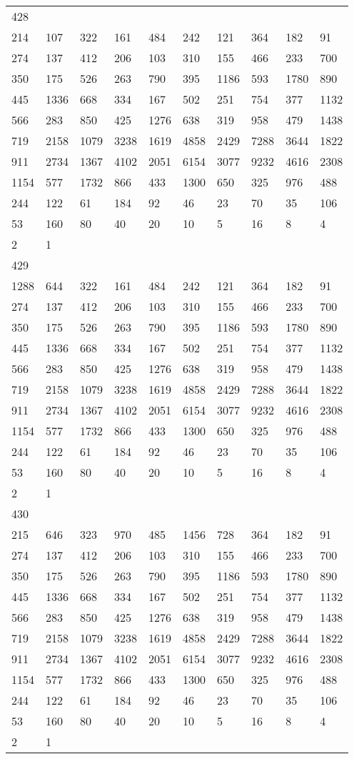 \begin{longtable}{*{10}{l}}
428&&&&&&&&&\\
214& 107& 322& 161& 484& 242& 121& 364& 182& 91\\
274& 137& 412& 206& 103& 310& 155& 466& 233& 700\\
350& 175& 526& 263& 790& 395& 1186& 593& 1780& 890\\
445& 1336& 668& 334& 167& 502& 251& 754& 377& 1132\\
566& 283& 850& 425& 1276& 638& 319& 958& 479& 1438\\
719& 2158& 1079& 3238& 1619& 4858& 2429& 7288& 3644& 1822\\
911& 2734& 1367& 4102& 2051& 6154& 3077& 9232& 4616& 2308\\
1154& 577& 1732& 866& 433& 1300& 650& 325& 976& 488\\
244& 122& 61& 184& 92& 46& 23& 70& 35& 106\\
53& 160& 80& 40& 20& 10& 5& 16& 8& 4\\
2& 1& \\

429&&&&&&&&&\\
1288& 644& 322& 161& 484& 242& 121& 364& 182& 91\\
274& 137& 412& 206& 103& 310& 155& 466& 233& 700\\
350& 175& 526& 263& 790& 395& 1186& 593& 1780& 890\\
445& 1336& 668& 334& 167& 502& 251& 754& 377& 1132\\
566& 283& 850& 425& 1276& 638& 319& 958& 479& 1438\\
719& 2158& 1079& 3238& 1619& 4858& 2429& 7288& 3644& 1822\\
911& 2734& 1367& 4102& 2051& 6154& 3077& 9232& 4616& 2308\\
1154& 577& 1732& 866& 433& 1300& 650& 325& 976& 488\\
244& 122& 61& 184& 92& 46& 23& 70& 35& 106\\
53& 160& 80& 40& 20& 10& 5& 16& 8& 4\\
2& 1& \\

430&&&&&&&&&\\
215& 646& 323& 970& 485& 1456& 728& 364& 182& 91\\
274& 137& 412& 206& 103& 310& 155& 466& 233& 700\\
350& 175& 526& 263& 790& 395& 1186& 593& 1780& 890\\
445& 1336& 668& 334& 167& 502& 251& 754& 377& 1132\\
566& 283& 850& 425& 1276& 638& 319& 958& 479& 1438\\
719& 2158& 1079& 3238& 1619& 4858& 2429& 7288& 3644& 1822\\
911& 2734& 1367& 4102& 2051& 6154& 3077& 9232& 4616& 2308\\
1154& 577& 1732& 866& 433& 1300& 650& 325& 976& 488\\
244& 122& 61& 184& 92& 46& 23& 70& 35& 106\\
53& 160& 80& 40& 20& 10& 5& 16& 8& 4\\
2& 1& \\


\end{longtable}
